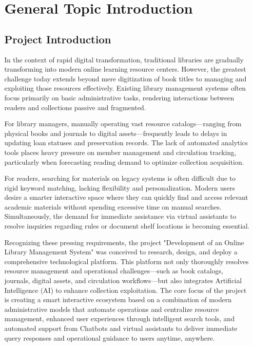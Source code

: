 \section{General Topic Introduction}

\subsection{Project Introduction}

In the context of rapid digital transformation, traditional libraries are gradually transforming into modern online learning resource centers. However, the greatest challenge today extends beyond mere digitization of book titles to managing and exploiting those resources effectively. Existing library management systems often focus primarily on basic administrative tasks, rendering interactions between readers and collections passive and fragmented.

For library managers, manually operating vast resource catalogs—ranging from physical books and journals to digital assets—frequently leads to delays in updating loan statuses and preservation records. The lack of automated analytics tools places heavy pressure on member management and circulation tracking, particularly when forecasting reading demand to optimize collection acquisition.

For readers, searching for materials on legacy systems is often difficult due to rigid keyword matching, lacking flexibility and personalization. Modern users desire a smarter interactive space where they can quickly find and access relevant academic materials without spending excessive time on manual searches. Simultaneously, the demand for immediate assistance via virtual assistants to resolve inquiries regarding rules or document shelf locations is becoming essential.

Recognizing these pressing requirements, the project "Development of an Online Library Management System" was conceived to research, design, and deploy a comprehensive technological platform. This platform not only thoroughly resolves resource management and operational challenges—such as book catalogs, journals, digital assets, and circulation workflows—but also integrates Artificial Intelligence (AI) to enhance collection exploitation. The core focus of the project is creating a smart interactive ecosystem based on a combination of modern administrative models that automate operations and centralize resource management, enhanced user experiences through intelligent search tools, and automated support from Chatbots and virtual assistants to deliver immediate query responses and operational guidance to users anytime, anywhere.

